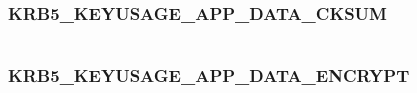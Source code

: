 \documentclass[letterpaper,10pt,english]{sphinxmanual}
\begin{document}
\begin{fulllineitems}
\label{appdev/refs/macros/KRB5_KEYUSAGE_AD_SIGNEDPATH:KRB5_KEYUSAGE_AD_SIGNEDPATH}
\end{fulllineitems}


\begin{tabulary}{\linewidth}{|L|L|}
\hline

 & 
\\\hline
\end{tabulary}



\subsubsection{KRB5\_KEYUSAGE\_APP\_DATA\_CKSUM}
\label{appdev/refs/macros/KRB5_KEYUSAGE_APP_DATA_CKSUM:krb5-keyusage-app-data-cksum-data}\label{appdev/refs/macros/KRB5_KEYUSAGE_APP_DATA_CKSUM::doc}\label{appdev/refs/macros/KRB5_KEYUSAGE_APP_DATA_CKSUM:krb5-keyusage-app-data-cksum}

\begin{fulllineitems}
\label{appdev/refs/macros/KRB5_KEYUSAGE_APP_DATA_CKSUM:KRB5_KEYUSAGE_APP_DATA_CKSUM}
\end{fulllineitems}


\begin{tabulary}{\linewidth}{|L|L|}
\hline

 & 
\\\hline
\end{tabulary}



\subsubsection{KRB5\_KEYUSAGE\_APP\_DATA\_ENCRYPT}
\label{appdev/refs/macros/KRB5_KEYUSAGE_APP_DATA_ENCRYPT:krb5-keyusage-app-data-encrypt}\label{appdev/refs/macros/KRB5_KEYUSAGE_APP_DATA_ENCRYPT:krb5-keyusage-app-data-encrypt-data}\label{appdev/refs/macros/KRB5_KEYUSAGE_APP_DATA_ENCRYPT::doc}

\begin{fulllineitems}
\label{appdev/refs/macros/KRB5_KEYUSAGE_APP_DATA_ENCRYPT:KRB5_KEYUSAGE_APP_DATA_ENCRYPT}
\end{fulllineitems}
\end{document}
